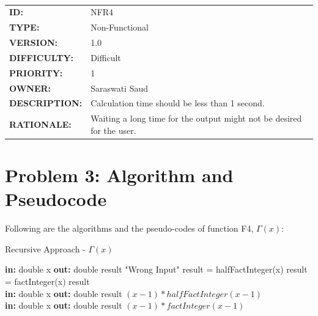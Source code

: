 \documentclass[a4paper,12pt]{article}
\begin{document}
        \\[10pt]
        \begin{tabular}{ |p{4cm} | p{11cm}| }
            \hline
            \textbf{ID:} & NFR4\\
            \textbf{TYPE:} & Non-Functional\\
            \textbf{VERSION:} & 1.0\\
            \textbf{DIFFICULTY:} & Difficult\\
            \textbf{PRIORITY:} & 1\\
            \textbf{OWNER:} & Saraswati Saud\\
            \textbf{DESCRIPTION:} & Calculation time should be less than 1 second. \\
            \textbf{RATIONALE:} & Waiting a long time for the output might not be desired for the user. \\
            \hline
        \end{tabular}

\newpage
\section{Problem 3: Algorithm and Pseudocode}
    Following are the algorithms and the pseudo-codes of function F4, $\Gamma(x)$:
    \begin{algorithm}
    \caption{Recursive Approach - $\Gamma(x)$ }
    \begin{algorithmic}
        \State \textbf{in: } double x
        \State \textbf{out: } double result
            \Return "Wrong Input"
        \Else {}
         \State result = halfFactInteger(x)
            \Else
            \State result = factInteger(x)
            \EndIf
        \State
        \Return result
        \EndIf
    \EndProcedure
    \\
    \State \textbf{in: } double x
    \State \textbf{out: } double result
    \State {}
        \Else
    \State \Return $(x-1) * halfFactInteger(x-1)$
    \EndIf
    \EndProcedure
    \\
    \State \textbf{in: } double x
    \State \textbf{out: } double result
    \State {}
        \Else
    \State \Return $(x-1) * factInteger(x-1)$
    \EndIf
    \EndProcedure
    \\
    \end{algorithmic}
    \end{algorithm}
\end{document}
